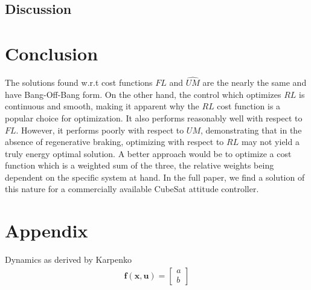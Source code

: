 \documentclass[]{aiaa-tc}%
\begin{document}
\subsection{Discussion}

     


\section{Conclusion}
The solutions found w.r.t cost functions $FL$ and $\hat{UM}$ are the nearly the same and have Bang-Off-Bang form. On the other hand, the control which optimizes $RL$ is continuous and smooth, making it apparent why the $RL$ cost function is a popular choice for optimization. It also performs reasonably well with respect to $FL$. However, it performs poorly with respect to $UM$, demonstrating that in the absence of regenerative braking, optimizing with respect to $RL$ may not yield a truly energy optimal solution. A better approach would be to optimize a cost function which is a weighted sum of the three, the relative weights being dependent on the specific system at hand. In the full paper, we find a solution of this nature for a commercially available CubeSat attitude controller. 


\section*{Appendix}

Dynamics as derived by Karpenko\cite{Karpenko2014}
\begin{align}
\textbf{f}(\textbf{x},\textbf{u}) = 
\begin{bmatrix}
a\\
b
\end{bmatrix}
\end{align}




\end{document}
